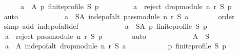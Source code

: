 \begin{isabellebody}
\ \ \ \ \isamarkupfalse%
\ \isamarkupfalse%
\isanewline
\ \ \ \ \ \ {\isachardoublequoteopen}{\isasymforall}a\ {\isasymin}\ {\isacharquery}{\kern0pt}A{\isachardot}{\kern0pt}\ {\isasymforall}p{\isachardot}{\kern0pt}\ finite{\isacharunderscore}{\kern0pt}profile\ S\ p\ {\isasymlongrightarrow}\isanewline
\ \ \ \ \ \ \ \ a\ {\isasymin}\ reject\ {\isacharparenleft}{\kern0pt}drop{\isacharunderscore}{\kern0pt}module\ n\ r{\isacharparenright}{\kern0pt}\ S\ p{\isachardoublequoteclose}\isanewline
\ \ \ \ \ \ \isamarkupfalse%
\ auto\isanewline
\ \ \ \ \isamarkupfalse%
\ \isamarkupfalse%
\isanewline
\ \ \ \ \ \ {\isachardoublequoteopen}{\isacharparenleft}{\kern0pt}{\isasymforall}a\ {\isasymin}\ S{\isacharminus}{\kern0pt}{\isacharquery}{\kern0pt}A{\isachardot}{\kern0pt}\ indep{\isacharunderscore}{\kern0pt}of{\isacharunderscore}{\kern0pt}alt\ {\isacharparenleft}{\kern0pt}pass{\isacharunderscore}{\kern0pt}module\ n\ r{\isacharparenright}{\kern0pt}\ S\ a{\isacharparenright}{\kern0pt}{\isachardoublequoteclose}\isanewline
\ \ \ \ \ \ \isamarkupfalse%
\ order\isanewline
\ \ \ \ \ \ \isamarkupfalse%
\ {\isacharparenleft}{\kern0pt}simp\ add{\isacharcolon}{\kern0pt}\ indep{\isacharunderscore}{\kern0pt}of{\isacharunderscore}{\kern0pt}alt{\isacharunderscore}{\kern0pt}def{\isacharparenright}{\kern0pt}\isanewline
\ \ \ \ \isamarkupfalse%
\ \isamarkupfalse%
\isanewline
\ \ \ \ \ \ {\isachardoublequoteopen}{\isasymforall}a\ {\isasymin}\ S{\isacharminus}{\kern0pt}{\isacharquery}{\kern0pt}A{\isachardot}{\kern0pt}\ {\isasymforall}p{\isachardot}{\kern0pt}\ finite{\isacharunderscore}{\kern0pt}profile\ S\ p\ {\isasymlongrightarrow}\isanewline
\ \ \ \ \ \ \ \ a\ {\isasymin}\ reject\ {\isacharparenleft}{\kern0pt}pass{\isacharunderscore}{\kern0pt}module\ n\ r{\isacharparenright}{\kern0pt}\ S\ p{\isachardoublequoteclose}\isanewline
\ \ \ \ \ \ \isamarkupfalse%
\ auto\isanewline
\ \ \ \ \isamarkupfalse%
\ \isamarkupfalse%
\isanewline
\ \ \ \ \ \ {\isachardoublequoteopen}{\isacharquery}{\kern0pt}A\ {\isasymsubseteq}\ S\ {\isasymand}\isanewline
\ \ \ \ \ \ \ \ {\isacharparenleft}{\kern0pt}{\isasymforall}a\ {\isasymin}\ {\isacharquery}{\kern0pt}A{\isachardot}{\kern0pt}\ indep{\isacharunderscore}{\kern0pt}of{\isacharunderscore}{\kern0pt}alt\ {\isacharparenleft}{\kern0pt}drop{\isacharunderscore}{\kern0pt}module\ n\ r{\isacharparenright}{\kern0pt}\ S\ a\ {\isasymand}\isanewline
\ \ \ \ \ \ \ \ \ \ {\isacharparenleft}{\kern0pt}{\isasymforall}p{\isachardot}{\kern0pt}\ finite{\isacharunderscore}{\kern0pt}profile\ S\ p\ {\isasymlongrightarrow}\isanewline

\end{isabellebody}
